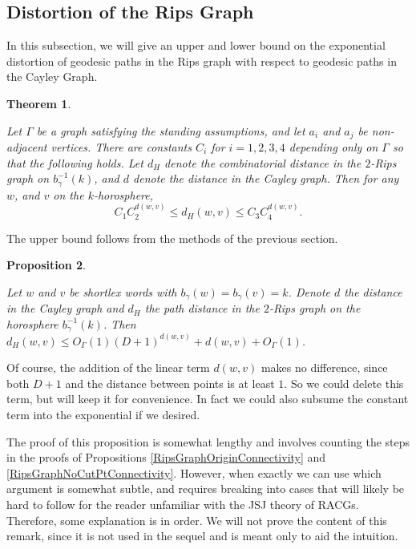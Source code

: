 \documentclass{amsart}
\newtheorem{theorem}{Theorem}[subsection]
\newtheorem{proposition}[theorem]{Proposition}
\theoremstyle{definition}
\theoremstyle{remark}
\begin{document}
	\subsection{Distortion of the Rips Graph}
	\label{subsec:RipsDistortion}

	In this subsection, we will give an upper and lower bound on the exponential distortion of geodesic paths in the Rips graph with respect to geodesic paths in the Cayley Graph.

	\begin{theorem}\label{RipsGraphDistortion}
		
		Let $\Gamma$ be a graph satisfying the standing assumptions, and let $a_i$ and $a_j$ be non-adjacent vertices. There are constants $C_i$ for $i=1, 2, 3, 4$ depending only on $\Gamma$ so that the following holds. Let $d_H$ denote the combinatorial distance in the $2$-Rips graph on $b_\gamma^{-1}(k)$, and $d$ denote the distance in the Cayley graph. Then for any $w$, and $v$ on the $k$-horosphere, $$C_1 C_2^{d(w,v)}\le d_H(w,v)\le C_3 C_4^{d(w,v)}.$$
		
	\end{theorem}	
	
	The upper bound follows from the methods of the previous section.
	
	\begin{proposition} \label{HorosphericalDistortionUpperBound}
		
		Let $w$ and $v$ be shortlex words with $b_\gamma(w)=b_\gamma(v) = k$. Denote $d$ the distance in the Cayley graph and $d_H$ the path distance in the $2$-Rips graph on the horosphere $b_\gamma^{-1}(k)$. Then $d_H(w,v)\le O_\Gamma(1)(D+1)^{d(w,v)}+d(w,v)+O_\Gamma(1)$.
		
		
	\end{proposition}
	
	Of course, the addition of the linear term $d(w,v)$ makes no difference, since both $D+1$ and the distance between points is at least $1$. So we could delete this term, but will keep it for convenience. In fact we could also subsume the constant term into the exponential if we desired.
	
	The proof of this proposition is somewhat lengthy and involves counting the steps in the proofs of Propositions \ref{RipsGraphOriginConnectivity} and \ref{RipsGraphNoCutPtConnectivity}. However, when exactly we can use which argument is somewhat subtle, and requires breaking into cases that will likely be hard to follow for the reader unfamiliar with the JSJ theory of RACGs. Therefore, some explanation is in order. We will not prove the content of this remark, since it is not used in the sequel and is meant only to aid the intuition.
\end{document}
